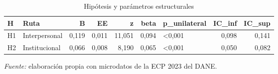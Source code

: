 \begin{table}

\caption{\label{tab:hipotesis}Hipótesis y parámetros estructurales}
\centering
\begin{tabular}[t]{llrrrrlrr}
\toprule
H & Ruta & B & EE & z & beta & p\_unilateral & IC\_inf & IC\_sup\\
\midrule
H1 & Interpersonal & 0,119 & 0,011 & 11,051 & 0,094 & <0,001 & 0,098 & 0,141\\
H2 & Institucional & 0,066 & 0,008 & 8,190 & 0,065 & <0,001 & 0,050 & 0,082\\
\bottomrule
\end{tabular}
\par\smallskip\noindent\parbox{\linewidth}{\footnotesize\textit{Fuente:} elaboración propia con microdatos de la ECP 2023 del DANE.}
\end{table}
